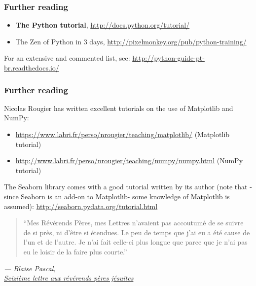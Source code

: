\documentclass[english,serif,mathserif,xcolor=pdftex,dvipsnames,table]{beamer}
\begin{document}
\begin{frame}
  \frametitle{Further reading}

  \begin{itemize}
    \item \textbf{The Python tutorial},
      {\small \url{http://docs.python.org/tutorial/}}
    \item {The Zen of Python in 3 days},
      {\small \url{http://pixelmonkey.org/pub/python-training/}}
  \end{itemize}

  \+   For an extensive and commented list, see:
  {\url{http://python-guide-pt-br.readthedocs.io/}}
\end{frame}

\begin{frame}
  \frametitle{Further reading}

  Nicolas Rougier has written excellent tutorials on the use of Matplotlib and NumPy:
  \begin{itemize}
  \item
    \url{https://www.labri.fr/perso/nrougier/teaching/matplotlib/} (Matplotlib tutorial)
  \item
    \url{http://www.labri.fr/perso/nrougier/teaching/numpy/numpy.html} (NumPy tutorial)
  \end{itemize}

  \+
  The Seaborn library comes with a good tutorial written by its author (note
  that -since Seaborn is an add-on to Matplotlib- some knowledge of Matplotlib
  is assumed): \url{http://seaborn.pydata.org/tutorial.html}
\end{frame}




\begin{frame}
  \begin{quote}
    ``Mes Révérends Pères, mes Lettres n'avaient pas accoutumé de se suivre de
    si près, ni d'être si étendues. Le peu de temps que j'ai eu a été cause de
    l'un et de l'autre. Je n'ai fait celle-ci plus longue que parce que je n'ai
    pas eu le loisir de la faire plus courte.''
  \end{quote}

  \+
  \begin{flushright}
    \small\em
    --- Blaise Pascal, \\
    \href{https://www.ebooksgratuits.com/ebooksfrance/pascal_les_provinciales.pdf}{Seizième
      lettre aux révérends pères jésuites}
  \end{flushright}
\end{frame}
\end{document}
